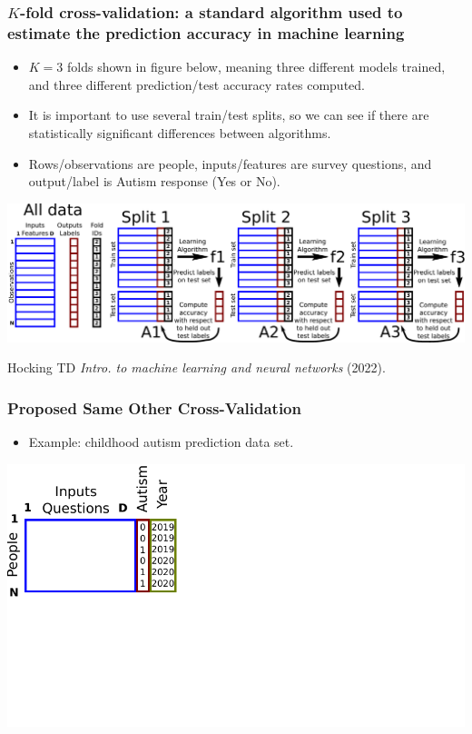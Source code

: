 \documentclass{beamer}
\begin{document}
\begin{frame}
  \frametitle{$K$-fold cross-validation: a standard algorithm used to estimate the prediction accuracy in machine learning}

  \begin{itemize}
  \item $K=3$ folds shown in figure below, meaning three different
    models trained, and three different prediction/test accuracy rates
    computed.
  \item It is important to use several train/test splits, so we can
    see if there are statistically significant differences between
    algorithms.
  \item Rows/observations are people, inputs/features are survey
    questions, and output/label is Autism response (Yes or No).
  \end{itemize}

  \includegraphics[width=\textwidth]{drawing-cross-validation.pdf}

  \small Hocking TD \emph{Intro. to machine learning and neural
    networks} (2022).
\end{frame}

\begin{frame}
  \frametitle{Proposed Same Other Cross-Validation}
  \begin{itemize}
  \item Example: childhood autism prediction data set.
  \end{itemize}
  \includegraphics[width=\textwidth]{drawing-cv-same-other-years-1.pdf}
\end{frame}
\end{document}
